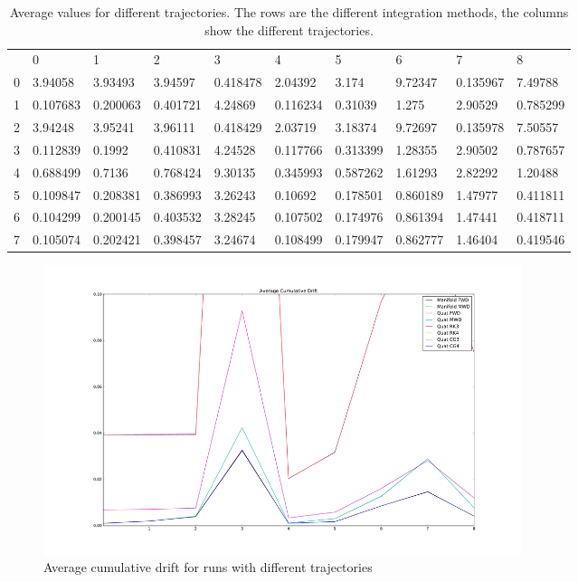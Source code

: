\documentclass[10pt,a4paper]{article}
\numberwithin{equation}{section}
\begin{document}
\begin{table}
\begin{center}
\begin{tabular}{ l | l | l | l | l | l | l | l | l | l}
 & 0 & 1 & 2 & 3 & 4 & 5 & 6 & 7 & 8 \\
0 & 3.94058 & 3.93493 & 3.94597 & 0.418478 & 2.04392 & 3.174 & 9.72347 & 0.135967 & 7.49788 \\
1 & 0.107683 & 0.200063 & 0.401721 & 4.24869 & 0.116234 & 0.31039 & 1.275 & 2.90529 & 0.785299 \\
2 & 3.94248 & 3.95241 & 3.96111 & 0.418429 & 2.03719 & 3.18374 & 9.72697 & 0.135978 & 7.50557 \\
3 & 0.112839 & 0.1992 & 0.410831 & 4.24528 & 0.117766 & 0.313399 & 1.28355 & 2.90502 & 0.787657 \\
4 & 0.688499 & 0.7136 & 0.768424 & 9.30135 & 0.345993 & 0.587262 & 1.61293 & 2.82292 & 1.20488 \\
5 & 0.109847 & 0.208381 & 0.386993 & 3.26243 & 0.10692 & 0.178501 & 0.860189 & 1.47977 & 0.411811 \\
6 & 0.104299 & 0.200145 & 0.403532 & 3.28245 & 0.107502 & 0.174976 & 0.861394 & 1.47441 & 0.418711 \\
7 & 0.105074 & 0.202421 & 0.398457 & 3.24674 & 0.108499 & 0.179947 & 0.862777 & 1.46404 & 0.419546
\end{tabular}
\end{center}
\caption{Average values for different trajectories. The rows are the different integration methods, the columns show the different trajectories.}
\label{tbl:rotation_integration_drift_values}
\end{table}

\begin{figure}
\includegraphics[width=14cm]{figures/average_cumulative_drift.pdf}
\caption{Average cumulative drift for runs with different trajectories}
\label{fig:average_cumulative_drift}
\end{figure}	
\end{document}

